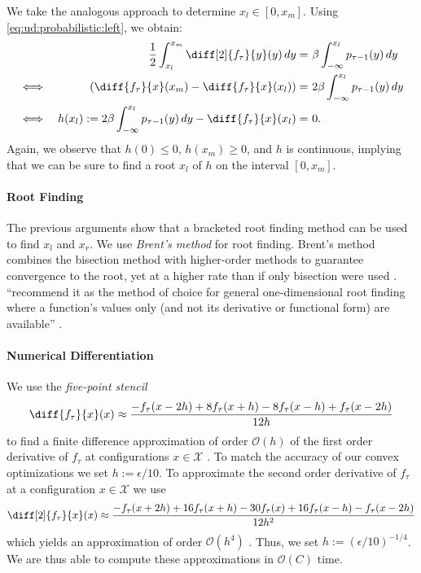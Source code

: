 We take the analogous approach to determine $x_l \in [0,x_m]$. Using \autoref{eq:ud:probabilistic:left}, we obtain: \begin{align*}
    && \frac{1}{2} \int_{x_l}^{x_m} \diff[2]{f_{\tau}}{y}(y) \,dy =&\ \beta \int_{-\infty}^{x_l} p_{\tau-1}(y) \,dy \\
    \iff&& \left(\diff{f_{\tau}}{x}(x_m) - \diff{f_{\tau}}{x}(x_l)\right) =&\ 2 \beta \int_{-\infty}^{x_l} p_{\tau-1}(y) \,dy \\
    \iff&& h(x_l) := 2 \beta \int_{-\infty}^{x_l} p_{\tau-1}(y) \,dy - \diff{f_{\tau}}{x}(x_l) =&\ 0.
\end{align*} Again, we observe that $h(0) \leq 0$, $h(x_m) \geq 0$, and $h$ is continuous, implying that we can be sure to find a root $x_l$ of $h$ on the interval $[0,x_m]$.

\paragraph{Root Finding} The previous arguments show that a bracketed root finding method can be used to find $x_l$ and $x_r$. We use \emph{Brent's method} for root finding. Brent's method combines the bisection method with higher-order methods to guarantee convergence to the root, yet at a higher rate than if only bisection were used \cite{Press2007}. \citeauthor*{Press2007} ``recommend it as the method of choice for general one-dimensional
root finding where a function’s values only (and not its derivative or functional form)
are available'' \cite{Press2007}.

\paragraph{Numerical Differentiation} We use the \emph{five-point stencil} \begin{align*}
    \diff{f_{\tau}}{x}(x) \approx \frac{-f_{\tau}(x - 2h) + 8 f_{\tau}(x + h) - 8 f_{\tau}(x - h) + f_{\tau}(x - 2h)}{12h}
\end{align*} to find a finite difference approximation of order $\mathcal{O}(h)$ of the first order derivative of $f_{\tau}$ at configurations $x \in \mathcal{X}$ \cite{Sauer2011}. To match the accuracy of our convex optimizations we set $h := \epsilon / 10$. To approximate the second order derivative of $f_{\tau}$ at a configuration $x \in \mathcal{X}$ we use \begin{align*}
    \diff[2]{f_{\tau}}{x}(x) \approx \frac{-f_{\tau}(x + 2h) + 16 f_{\tau}(x+h) - 30 f_{\tau}(x) + 16 f_{\tau}(x-h) - f_{\tau}(x - 2h)}{12 h^2}
\end{align*} which yields an approximation of order $\mathcal{O}(h^4)$ \cite{Sauer2011}. Thus, we set $h := (\epsilon / 10)^{-1/4}$. We are thus able to compute these approximations in $\mathcal{O}(C)$ time.

